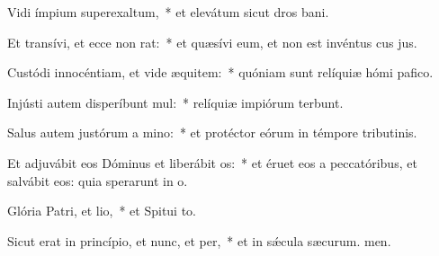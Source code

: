 \item Vidi ímpium superexaltum,~* et elevátum sicut dros bani.
\item Et transívi, et ecce non rat:~* et quæsívi eum, et non est invéntus cus jus.
\item Custódi innocéntiam, et vide æquitem:~* quóniam sunt relíquiæ hómi pafico.
\item Injústi autem disperíbunt mul:~* relíquiæ impiórum terbunt.
\item Salus autem justórum a mino:~* et protéctor eórum in témpore tributinis.
\item Et adjuvábit eos Dóminus et liberábit os:~* et éruet eos a peccatóribus, et salvábit eos: quia sperarunt in o.
\item Glória Patri, et lio,~* et Spitui to.
\item Sicut erat in princípio, et nunc, et per,~* et in sǽcula sæcurum. men.
